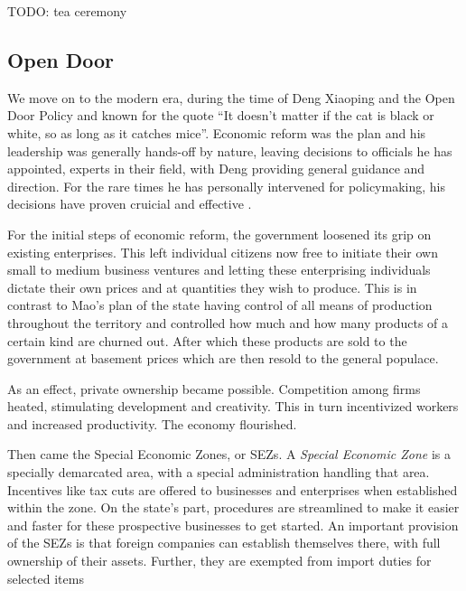 TODO: tea ceremony

\subsection{Open Door}


We move on to the modern era, during the time of Deng Xiaoping and the Open Door
Policy and known for the quote ``It doesn't matter if the cat is black or white, so
as long as it catches mice''. Economic reform was the plan and his leadership
was generally hands-off by nature, leaving decisions to officials he has
appointed, experts in their field, with Deng providing general guidance and
direction. For the rare times he has personally intervened for policymaking, his
decisions have proven cruicial and effective \autocite{naughton_deng_1993}.

For the initial steps of economic reform, the government loosened its grip on
existing enterprises. This left individual citizens now free to initiate their own
small to medium business ventures and letting these enterprising individuals dictate
their own prices and at quantities they wish to produce. This is in contrast to
Mao's plan of the state having control of all means of production throughout the
territory and controlled how much and how many products of a certain kind are
churned out. After which these products are sold to the government at basement
prices which are then resold to the general populace.

As an effect, private ownership became possible. Competition among firms heated,
stimulating development and creativity. This in turn incentivized workers and
increased productivity. The economy flourished.


Then came the Special Economic Zones, or SEZs. A \emph{Special Economic Zone} is a
specially demarcated area, with a special administration handling that area.
Incentives like tax cuts are offered to businesses and enterprises when
established within the zone. On the state's part, procedures are streamlined to
make it easier and faster for these prospective businesses to get started.
An important provision of the SEZs is that foreign companies can establish
themselves there, with full ownership of their assets. Further, they are
exempted from import duties for selected items
\autocites{zeng_how_2011}{jaggi_chinas_1996}

